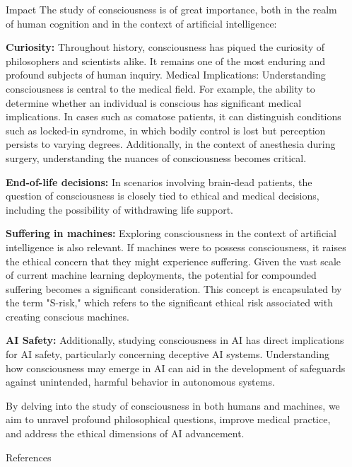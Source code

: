 \documentclass[final]{beamer}
\newlength{\sepwidth}
\newlength{\colwidth}
\newcommand{\separatorcolumn}{\begin{column}{\sepwidth}\end{column}}
\begin{document}
\begin{frame}[t]
\begin{columns}[t]
\begin{column}{\colwidth}
\begin{block}{Impact}
The study of consciousness is of great importance, both in the realm of human cognition and in the context of artificial intelligence:


\textbf{Curiosity:} Throughout history, consciousness has piqued the curiosity of philosophers and scientists alike. It remains one of the most enduring and profound subjects of human inquiry.
    Medical Implications: Understanding consciousness is central to the medical field. For example, the ability to determine whether an individual is conscious has significant medical implications. In cases such as comatose patients, it can distinguish conditions such as locked-in syndrome, in which bodily control is lost but perception persists to varying degrees. Additionally, in the context of anesthesia during surgery, understanding the nuances of consciousness becomes critical.

\textbf{End-of-life decisions:} In scenarios involving brain-dead patients, the question of consciousness is closely tied to ethical and medical decisions, including the possibility of withdrawing life support.


\textbf{Suffering in machines:} Exploring consciousness in the context of artificial intelligence is also relevant. If machines were to possess consciousness, it raises the ethical concern that they might experience suffering. Given the vast scale of current machine learning deployments, the potential for compounded suffering becomes a significant consideration. This concept is encapsulated by the term "S-risk," which refers to the significant ethical risk associated with creating conscious machines.

\textbf{AI Safety:} Additionally, studying consciousness in AI has direct implications for AI safety, particularly concerning deceptive AI systems. Understanding how consciousness may emerge in AI can aid in the development of safeguards against unintended, harmful behavior in autonomous systems.

By delving into the study of consciousness in both humans and machines, we aim to unravel profound philosophical questions, improve medical practice, and address the ethical dimensions of AI advancement.
  \end{block}

  \begin{block}{References}

    \nocite{*}
    \footnotesize{}

  \end{block}

\end{column}

\separatorcolumn
\end{columns}
\end{frame}
\end{document}
